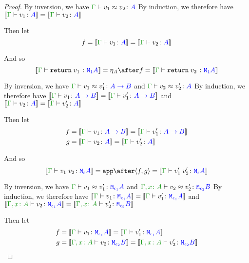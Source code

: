 \documentclass{report}
\begin{document}
\begin{framed}
\begin{proof}
        
        By inversion, we have $\gberelation{v_1}{v_2}{A}$
        By induction, we therefore have $\deno{\gtyperelation{v_1}{A}} = \deno{\gtyperelation{v_2}{A}}$
        
        Then let
        \begin{equation}
            f = \deno{\gtyperelation{v_1}{A}} = \deno{\gtyperelation{v_2}{A}}
        \end{equation}
        
        And so
        \begin{equation}
            \deno{\gtyperelation{\return{v_1}}{\M{\1}{A}}} = \point{A}\after f = \deno{\gtyperelation{\return{v_2}}{\M{\1}{A}}}
        \end{equation}
        
        
        By inversion, we have $\gberelation{v_1}{v_1'}{\ab}$ and $\gberelation{v_2}{v_2'}{A}$
        By induction, we therefore have $\deno{\gtyperelation{v_1}{\ab}}= \deno{\gtyperelation{v_1'}{\ab}}$ and $\deno{\gtyperelation{v_2}{A}} = \deno{\gtyperelation{v_2'}{A}}$
        
        Then let
        \begin{align*}
            f &{}= \deno{\gtyperelation{v_1}{\ab}} = \deno{\gtyperelation{v_1'}{\ab}}\\
            g &{}= \deno{\gtyperelation{v_2}{A}} = \deno{\gtyperelation{v_2'}{A}}
        \end{align*}
        
        
        
        And so
        \begin{equation}
            \deno{\gtyperelation{\apply{v_1}{v_2}}{\M{\e}{A}}} = \app\after\pr{f}{g} = \deno{\gtyperelation{\apply{v_1'}{v_2'}}{\M{\e}{A}}}
        \end{equation}
        
        
        By inversion, we have $\gberelation{v_1}{v_1'}{\M{\e_1}{A}}$ and $\berelation{\gax}{v_2}{v_2'}{\M{\e_2}{B}}$
        By induction, we therefore have $\deno{\gtyperelation{v_1}{\M{\e_1}{A}}}= \deno{\gtyperelation{v_1'}{\M{\e_1}{A}}}$ and $\deno{\typerelation{\gax}{v_2}{\M{\e_1}{A}}} = \deno{\typerelation{\gax}{v_2'}{\M{\e_2}{B}}}$
        
        Then let
        \begin{align*}
            f &{}=\deno{\gtyperelation{v_1}{\M{\e_1}{A}}}= \deno{\gtyperelation{v_1'}{\M{\e_1}{A}}}\\
            g &{}=\deno{\typerelation{\gax}{v_2}{\M{\e_2}{B}}} = \deno{\typerelation{\gax}{v_2'}{\M{\e_2}{B}}}
        \end{align*}
        

\end{proof}
\end{framed}
\end{document}
